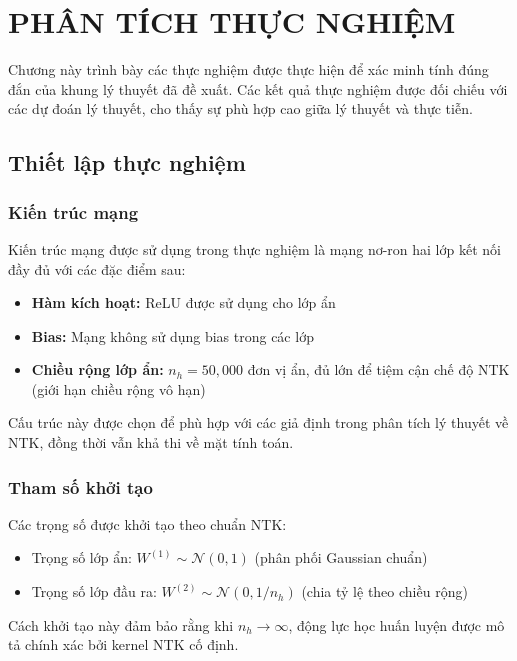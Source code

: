 \chapter{PHÂN TÍCH THỰC NGHIỆM}

Chương này trình bày các thực nghiệm được thực hiện để xác minh tính đúng đắn của khung lý thuyết đã đề xuất. Các kết quả thực nghiệm được đối chiếu với các dự đoán lý thuyết, cho thấy sự phù hợp cao giữa lý thuyết và thực tiễn.

\section{Thiết lập thực nghiệm}

\subsection{Kiến trúc mạng}

Kiến trúc mạng được sử dụng trong thực nghiệm là mạng nơ-ron hai lớp kết nối đầy đủ với các đặc điểm sau:
\begin{itemize}
    \item \textbf{Hàm kích hoạt:} ReLU được sử dụng cho lớp ẩn
    \item \textbf{Bias:} Mạng không sử dụng bias trong các lớp
    \item \textbf{Chiều rộng lớp ẩn:} $n_h = 50,000$ đơn vị ẩn, đủ lớn để tiệm cận chế độ NTK (giới hạn chiều rộng vô hạn)
\end{itemize}

Cấu trúc này được chọn để phù hợp với các giả định trong phân tích lý thuyết về NTK, đồng thời vẫn khả thi về mặt tính toán.

\subsection{Tham số khởi tạo}

Các trọng số được khởi tạo theo chuẩn NTK:
\begin{itemize}
    \item Trọng số lớp ẩn: $W^{(1)} \sim \mathcal{N}(0, 1)$ (phân phối Gaussian chuẩn)
    \item Trọng số lớp đầu ra: $W^{(2)} \sim \mathcal{N}(0, 1/n_h)$ (chia tỷ lệ theo chiều rộng)
\end{itemize}

Cách khởi tạo này đảm bảo rằng khi $n_h \rightarrow \infty$, động lực học huấn luyện được mô tả chính xác bởi kernel NTK cố định.

